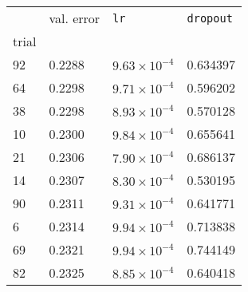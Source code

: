 \begin{tabular}{lp{2.3cm}p{2.3cm}p{2.3cm}}
\toprule
{} &  val. error &         \texttt{lr} &  \texttt{dropout} \\
trial &             &                     &                   \\
\midrule
92    &      0.2288 & $9.63\times10^{-4}$ &          0.634397 \\
64    &      0.2298 & $9.71\times10^{-4}$ &          0.596202 \\
38    &      0.2298 & $8.93\times10^{-4}$ &          0.570128 \\
10    &      0.2300 & $9.84\times10^{-4}$ &          0.655641 \\
21    &      0.2306 & $7.90\times10^{-4}$ &          0.686137 \\
14    &      0.2307 & $8.30\times10^{-4}$ &          0.530195 \\
90    &      0.2311 & $9.31\times10^{-4}$ &          0.641771 \\
6     &      0.2314 & $9.94\times10^{-4}$ &          0.713838 \\
69    &      0.2321 & $9.94\times10^{-4}$ &          0.744149 \\
82    &      0.2325 & $8.85\times10^{-4}$ &          0.640418 \\
\bottomrule
\end{tabular}
